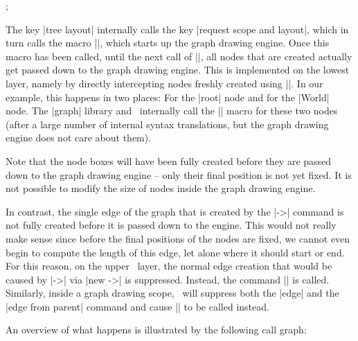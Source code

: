 \begin{codeexample}[]
  ;
\end{codeexample}

The key |tree layout| internally calls the key |request scope and layout|,
which in turn calls the macro |\pgfgdbeginscope|, which starts up the
graph drawing engine. Once this macro has been 
called, until the next call of |\pgfgdendscope|, all nodes that are
created actually get passed down to the graph drawing engine. This is
implemented on the lowest layer, namely by directly intercepting
nodes freshly created using |\pgfnode|. In our example, this happens
in two places: For the |root| node and for the |World| node. The
|graph| library and \tikzname\ internally call the |\pgfnode| macro
for these two nodes (after a large number of internal syntax
translations, but the graph drawing engine does not care about them).

Note that the node boxes will have been fully created before they are
passed down to the graph drawing engine -- only their final position
is not yet fixed. It is not possible to modify the size of nodes
inside the graph drawing engine. 

In contrast, the single edge of the graph that is created by the |->|
command is not fully created before it is passed down to the
engine. This would not really make sense since before the final
positions of the nodes are fixed, we cannot even begin to compute the
length of this edge, let alone where it should start or end. For this
reason, on the upper \tikzname\ layer, the normal edge creation that
would be caused by |->| via |new ->| is suppressed. Instead, the
command |\pgfgdedge| is called. Similarly, inside a graph drawing
scope, \tikzname\ will suppress both the |edge| and the
|edge from parent| command and cause |\pgfgdedge| to be called
instead. 

An overview of what happens is illustrated by the following call graph:

